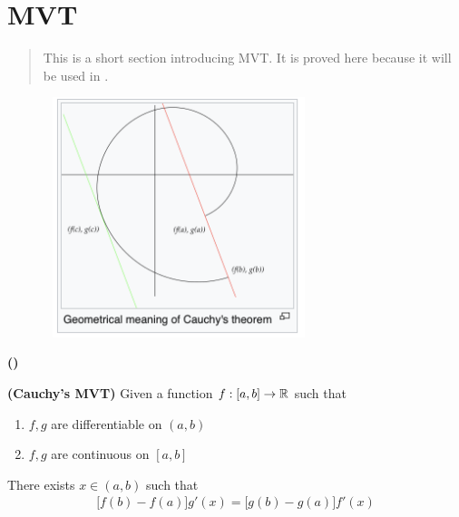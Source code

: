 \documentclass{report}
\begin{document}
\section{MVT}
\begin{abstract}
  This is a short section introducing MVT. It is proved here because it will be used in . 
\end{abstract}
\begin{center}
   \begin{minipage}{0.9\linewidth}  
       \centering       
\includegraphics[height=7cm,width=10cm]{CMVT.png}
   \end{minipage}
\end{center}
\hspace{3cm}
\begin{theorem}
\textbf{()}
\end{theorem}
\begin{theorem}
\label{CMVT}
\textbf{(Cauchy's MVT)} Given a function $f:[a,b]\to \mathbb{R}$ such that  
\begin{enumerate}[label=(\alph*)]
  \item $f,g$ are  differentiable on $(a,b)$
  \item $f,g$ are continuous on $[a,b]$
\end{enumerate}
There exists $x \in (a,b)$ such that 
 \begin{align*}
   \big[f(b)-f(a) \big]g'(x)=\big[g(b)-g(a) \big]f'(x)
\end{align*}
\end{theorem}
\end{document}
